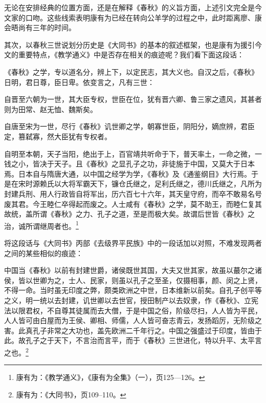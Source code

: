 \documentclass[a4paper, 12pt, openright]{ctexbook}
\renewenvironment{quote}
  {\list{}{\rightmargin2\ccwd \leftmargin2\ccwd \itemindent=2\ccwd \listparindent=2\ccwd}%
   \item\relax\small\kaishu\color{black}}
  {\endlist}
\begin{document}
无论在安排经典的位置方面，还是在解释《春秋》的义旨方面，上述引文完全是今文家的口吻。这些线索表明康有为已经在转向公羊学的过程之中，此时距离廖、康会晤尚有三年的时间。

其次，以春秋三世说划分历史是《大同书》的基本的叙述框架，也是康有为援引今文的重要特点，《教学通义》中是否存在相关的痕迹呢？我们看下面这段话：

\begin{quote}
《春秋》之学，专以道名分，辨上下，以定民志，其大义也。自汉之后，《春秋》日明，君日尊，臣日卑。依变言之，凡有三世：

自晋至六朝为一世，其大臣专权，世臣在位，犹有晋六卿、鲁三家之遗风，其甚者则为田常、赵无恤、魏斯矣。

自唐至宋为一世，尽行《春秋》讥世卿之学，朝寡世臣，阴阳分，嫡庶辨，君臣定，篡弑寡，然大臣犹有专权者。

自明至本朝，天子当阳，绝出于上，百官靖共听命于下，普天率土，一命之微，一钱之小，皆决于天子。且《春秋》之显孔子之功，非徒施于中国，又莫大于日本焉。日本自与隋唐大通，以中国之经学为学，《春秋》及《通鉴纲目》大行焉。于是在宋时源赖氏以大将军霸天下，镰仓氏继之，足利氏继之，德川氏继之，凡所为封建兵刑、用人行政皆自将军出，历六百七十六年，其天皇守府，而卒不敢易名号废其君。今王睦仁卒得起而废之。人士咸有《春秋》之学，莫不助王，而睦仁复其故统，盖所谓《春秋》之力、孔子之道，至是而极大矣。故谓后世皆《春秋》之治，诚所谓继周者也。\footnote{康有为：《教学通义》，《康有为全集》（一），页125—126。}
\end{quote}

将这段话与《大同书》丙部《去级界平民族》中的一段话加以对照，不难发现两者之间的某些相似的痕迹：

\begin{quote}
中国当《春秋》以前有封建世爵，诸侯既世其国，大夫又世其家，故虽以蕞尔之诸侯，皆以世卿为之，士人、民家，则虽以孔子之至圣，仅摄相事，颜、闵之上贤，不得一命。当时虽无印度之弊，颇类欧洲之中世，日本维新以前矣。自孔子创平等之义，明一统以去封建，讥世卿以去世官，授田制产以去奴隶，作《春秋》、立宪法以限君权，不自尊其徒属而去大僧，于是中国之俗，阶级尽扫，人人皆为平民，人人皆可由白屋而为王侯、卿相、师儒，人人皆可奋志青云，发扬蹈厉，无阶级之害。此真孔子非常之大功也，盖先欧洲二千年行之。中国之强盛过于印度，皆由于此。故孔子之于天下，不言治而言平，而于《春秋》三世进化，特以升平、太平言之也。\footnote{康有为：《大同书》，页109--110。}
\end{quote}
\end{document}
